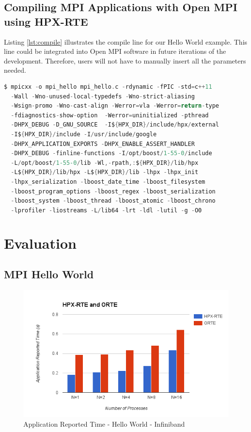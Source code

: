 \subsection{Compiling MPI Applications with Open MPI using HPX-RTE}
Listing \ref{lst:compile} illustrates the compile line for our Hello World example. This line could be integrated into Open MPI software in future iterations of the development. Therefore, users will not have to manually insert all the parameters needed.

\begin{lstlisting}[language=C, frame=single, basicstyle=\footnotesize, caption=Compile Line for Hello World\label{lst:compile}]
  $ mpicxx -o mpi_hello mpi_hello.c -rdynamic -fPIC -std=c++11
  -Wall -Wno-unused-local-typedefs -Wno-strict-aliasing
  -Wsign-promo -Wno-cast-align -Werror=vla -Werror=return-type
  -fdiagnostics-show-option  -Werror=uninitialized -pthread
  -DHPX_DEBUG -D_GNU_SOURCE  -I${HPX_DIR}/include/hpx/external
  -I${HPX_DIR}/include -I/usr/include/google
  -DHPX_APPLICATION_EXPORTS -DHPX_ENABLE_ASSERT_HANDLER
  -DHPX_DEBUG -finline-functions -I/opt/boost/1-55-0/include
  -L/opt/boost/1-55-0/lib -Wl,-rpath,:${HPX_DIR}/lib/hpx
  -L${HPX_DIR}/lib/hpx -L${HPX_DIR}/lib -lhpx -lhpx_init
  -lhpx_serialization -lboost_date_time -lboost_filesystem
  -lboost_program_options -lboost_regex -lboost_serialization
  -lboost_system -lboost_thread -lboost_atomic -lboost_chrono
  -lprofiler -liostreams -L/lib64 -lrt -ldl -lutil -g -O0
\end{lstlisting}


\section{Evaluation}

\subsection{MPI Hello World}

\begin{figure}[h!]
\centering
\includegraphics[scale=0.7]{images/time-app-hello-world-infiniband.png}
\caption[Application Reported Time - Hello World - Infiniband]{Application Reported Time - Hello World - Infiniband}
\label{fig:time-app-hello-world-infiniband}
\end{figure}



